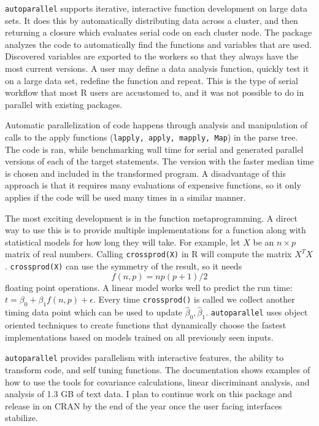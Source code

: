 \documentclass[12pt]{article}
\begin{document}
\texttt{autoparallel} supports iterative, interactive function development
on large data sets. It does this by automatically distributing data across
a cluster, and then returning a closure which evaluates serial code on each
cluster node. The package analyzes the code to automatically find the
functions and variables that are used. Discovered variables are exported to
the workers so that they always have the most current
versions. A user may define a data analysis function, quickly test it on a
large data set, redefine the function and repeat.  This is the type of
serial workflow that most R users are accustomed to, and it was not
possible to do in parallel with existing packages.

Automatic parallelization of code happens through analysis and
manipulation of calls to the apply functions (\texttt{lapply, apply,
mapply, Map}) in the parse tree. The code is ran, while benchmarking wall
time for serial and generated parallel versions of each of the target
statements. The version with the faster median time is chosen and included
in the transformed program.  A disadvantage of this approach is that it
requires many evaluations of expensive functions, so it only applies if the
code will be used many times in a similar manner.

The most exciting development is in the function metaprogramming. A direct
way to use this is to provide multiple implementations for a function along
with statistical models for how long they will take. For example, let $X$
be an $n \times p$ matrix of real numbers. Calling \texttt{crossprod(X)} in
R will compute the matrix $X^T X$. \texttt{crossprod(X)} can use the
symmetry of the result, so it needs 
\begin{equation}
    \label{eq:f}
    f(n, p) = n p (p + 1) / 2
\end{equation}
floating point operations. A linear model works well to predict the run
time: $t = \beta_0 + \beta_1 f(n, p) + \epsilon$. Every time
\texttt{crossprod()} is called we collect another timing data point which
can be used to update $\hat{\beta}_0, \hat{\beta}_1$. \texttt{autoparallel}
uses object oriented techniques to create functions that dynamically choose
the fastest implementations based on models trained on all previously seen
inputs.


\texttt{autoparallel} provides parallelism with interactive features, the
ability to transform code, and self tuning functions.  The documentation
shows examples of how to use the tools for covariance calculations, linear
discriminant analysis, and analysis of 1.3 GB of text data. I plan to
continue work on this package and release in on CRAN by the end of the year
once the user facing interfaces stabilize.

\hfill


 
\end{document}
